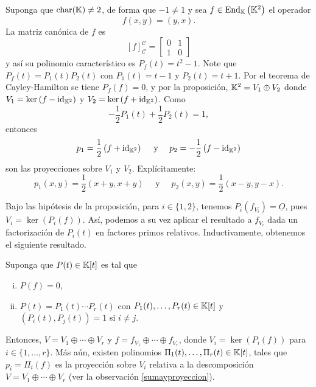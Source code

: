 \begin{ejem}
Suponga que $\operatorname{char}(\mathbb{K})\ne 2$, de forma que $-1\ne 1$ y sea $f\in\operatorname{End}_{\mathbb{K}}\left(\mathbb{K}^2\right)$ el operador
$$f(x,y)=(y,x).$$
La matriz canónica de $f$ es
$$\left[ f\right]^{\mathcal{C}}_{\mathcal{C}}=
\left[\begin{array}{rr}
0 & 1\\ 1 & 0
\end{array}\right]$$
y así su polinomio característico es $P_f(t)=t^2-1$. Note que $P_f(t)=P_1(t)P_2(t)$ con $P_1(t)=t-1$ y $P_2(t)=t+1$. Por el teorema de Cayley-Hamilton se tiene $P_f(f)=0$, y por la proposición, $\mathbb{K}^2=V_1\oplus V_2$ donde $V_1=\ker\left(f-\operatorname{id}_{\mathbb{K}^2}\right)$ y $V_2=\ker\left(f+\operatorname{id}_{\mathbb{K}^2}\right)$. Como
$$-\frac{1}{2}P_1(t)+\frac{1}{2}P_2(t)=1,$$
entonces
$$p_1=\frac{1}{2}\left(f+\operatorname{id}_{\mathbb{K}^2}\right)\quad\textrm{ y }\quad p_2=-\frac{1}{2}\left(f-\operatorname{id}_{\mathbb{K}^2}\right)$$
son las proyecciones sobre $V_1$ y $V_2$. Expl\'icitamente:
$$p_1(x,y)=\frac{1}{2}(x+y,x+y)\quad\textrm{ y }\quad p_2(x,y)=\frac{1}{2}(x-y,y-x).$$
\end{ejem}

\begin{obs}
Bajo las hipótesis de la proposición, para $i\in\{1,2\}$, tenemos $P_i(f_{V_i})=\underline{O}$, pues $V_i=\ker\left(P_i(f)\right)$. As\'i, podemos a su vez aplicar el resultado a $f_{V_i}$ dada un factorización de $P_i(t)$ en factores primos relativos. Inductivamente, obtenemos el siguiente resultado. 
\end{obs}

\begin{prop}\label{propdescomp}
  Suponga que $P(t)\in \mathbb{K}[t]$ es tal que
  \begin{enumerate}[(i)]
    \item $P(f)=0$,
    \item $P(t)=P_1(t)\cdots P_r(t)$ con $P_1(t),\ldots,P_r(t)\in\mathbb{K}[t]$ y $\left(P_i(t),P_j(t)\right)=1$ si $i\ne j$.
  \end{enumerate}
  Entonces, $V=V_1\oplus\cdots\oplus V_r$ y $f=f_{V_1}\oplus\cdots\oplus f_{V_r}$, donde $V_i=\ker\left(P_i(f)\right)$ para $i\in\{1,\ldots,r\}$. M\'as a\'un, existen polinomios $\Pi_1(t),\ldots,\Pi_r(t)\in \mathbb{K}[t]$, tales que $p_i=\Pi_i(f)$ es la proyección sobre $V_i$ relativa a la descomposición $V=V_1\oplus\cdots\oplus V_r$ (ver la observación \ref{sumayproyeccion}).
\end{prop}

